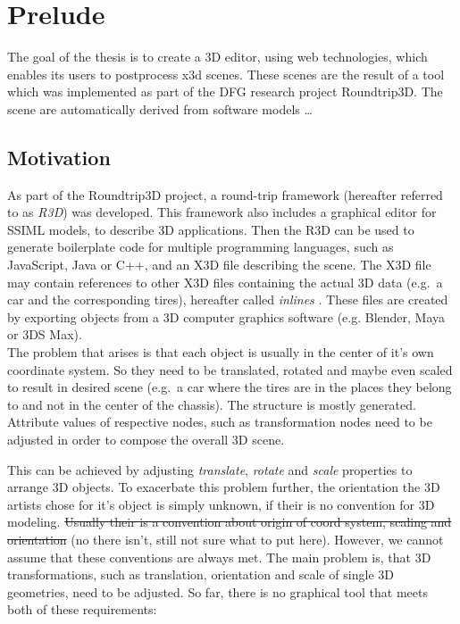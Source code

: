 
\section{Prelude}
\label{sec:Prelude}

The goal of the thesis is to create a 3D editor, using web technologies,
which enables its users to postprocess x3d scenes. These scenes are the
result of a tool which was implemented as part of the DFG research
project Roundtrip3D. The scene are automatically derived from
software models \ldots{}

\subsection{Motivation}\label{motivation}

As part of the Roundtrip3D project, a round-trip framework (hereafter
referred to as \emph{R3D}) was developed. This framework also includes a
graphical editor for SSIML models, to describe 3D applications. Then the
R3D can be used to generate boilerplate code for multiple programming
languages, such as JavaScript, Java or C++, and an X3D file describing
the scene. The X3D file may contain references to other X3D files
containing the actual 3D data (e.g.~a car and the corresponding tires),
hereafter called \emph{inlines} . These files are created by exporting
objects from a 3D computer graphics software (e.g. Blender,
Maya or 3DS Max).\\
The problem that arises is that each object is usually in the center of
it's own coordinate system. So they need to be translated, rotated and
maybe even scaled to result in desired scene (e.g.~a car where the tires
are in the places they belong to and not in the center of the chassis).
The structure is mostly generated. Attribute values of respective nodes,
such as transformation nodes need to be adjusted in order to compose the
overall 3D scene.


This can be achieved by adjusting \emph{translate}, \emph{rotate} and
\emph{scale} properties to arrange 3D objects. To exacerbate this
problem further, the orientation the 3D artists chose for it's object is
simply unknown, if their is no convention for 3D modeling. \sout{Usually
their is a convention about origin of coord system, scaling and
orientation} (no there isn't, still not sure what to put here). However, we cannot assume that these
conventions are always met. The main problem is, that 3D
transformations, such as translation, orientation and scale of single 3D
geometries, need to be adjusted. So far, there is no graphical tool that
meets both of these requirements:

